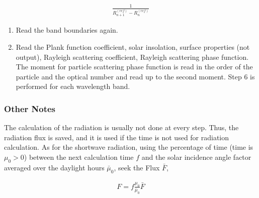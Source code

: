 \begin{eqnarray}
   \frac{1}{R_{n+1}^{(r e f)}-R_{n}^{(r e f)}}
\end{eqnarray}

\begin{enumerate}
\def\labelenumi{\arabic{enumi}.}
\setcounter{enumi}{4}
\item
  Read the band boundaries again.
\item
  Read the Plank function coefficient, solar insolation, surface
  properties (not output), Rayleigh scattering coefficient, Rayleigh
  scattering phase function. The moment for particle scattering phase
  function is read in the order of the particle and the optical number
  and read up to the second moment. Step 6 is performed for each
  wavelength band.
\end{enumerate}

\hypertarget{other-notes}{%
\subsubsection{Other Notes}\label{other-notes}}

The calculation of the radiation is usually not done at every step.
Thus, the radiation flux is saved, and it is used if the time is not
used for radiation calculation. As for the shortwave radiation, using
the percentage of time (time is \(\mu_{0}>0\)) between the next
calculation time \(f\) and the solar incidence angle factor averaged
over the daylight hours \(\bar{\mu}_{0}\), seek the Flux \(\bar{F}\),

\begin{eqnarray}
{F}=f \frac{\mu_{0}}{\bar{\mu}_{0}} \bar{F}
\end{eqnarray}
